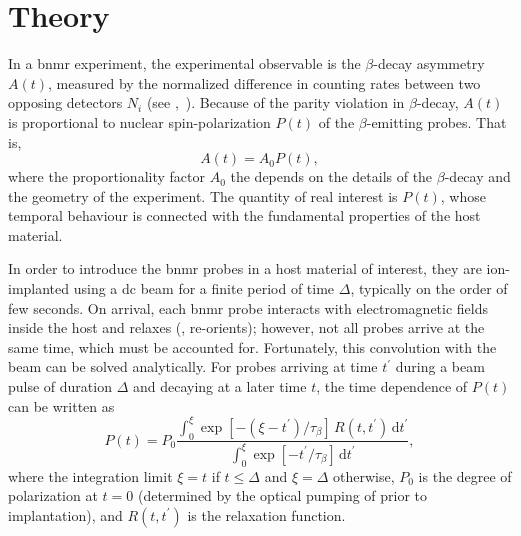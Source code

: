 \section{Theory \label{sec:theory}}

In a \gls{bnmr} experiment, the experimental observable is the $\beta$-decay asymmetry $A(t)$, measured by the normalized difference in counting rates between two opposing detectors $N_{i}$ (see ,~\cite{1983-Ackermann-TCP-31-291, 2015-MacFarlane-SSNMR-68-1}).
Because of the parity violation in $\beta$-decay, $A(t)$ is proportional to nuclear spin-polarization $P(t)$ of the $\beta$-emitting probes.
That is,
\begin{equation}
   A(t) = A_{0} P(t),
\end{equation}
where the proportionality factor $A_{0}$ the depends on the details of the $\beta$-decay and the geometry of the experiment.
The quantity of real interest is $P(t)$, whose temporal behaviour is connected with the fundamental properties of the host material.

In order to introduce the \gls{bnmr} probes in a host material of interest, they are ion-implanted using a \gls{dc} beam for a finite period of time $\Delta$, typically on the order of few seconds.
On arrival, each \gls{bnmr} probe interacts with electromagnetic fields inside the host and relaxes (, re-orients);
however, not all probes arrive at the same time, which must be accounted for.
Fortunately, this convolution with the beam can be solved analytically.
For probes arriving at time $t^{\prime}$ during a beam pulse of duration $\Delta$ and decaying at a later time $t$, the time dependence of $P(t)$ can be written as~\cite{2006-Salman-PRL-96-147601, 2015-MacFarlane-PRB-92-064409}
%
\begin{equation} \label{eq:polarization}
P(t) = P_0 \frac{ \displaystyle \int_{0}^{\xi} \exp \left [ -\left (\xi - t^{\prime} \right ) / \tau_{\beta} \right ] \, R \left (t,t^{\prime} \right ) \, \mathrm{d}t^{\prime} }{ \displaystyle \int_{0}^{\xi} \exp \left [ -t^{\prime} / \tau_{\beta} \right ] \, \mathrm{d}t^{\prime} },
\end{equation}
%
where the integration limit $\xi = t$ if $t \leq \Delta$ and $\xi = \Delta$ otherwise,
$P_{0}$ is the degree of polarization at $t = 0$ (determined by the optical pumping of  prior to implantation),
and $R \left (t, t^{\prime} \right )$ is the relaxation function.

